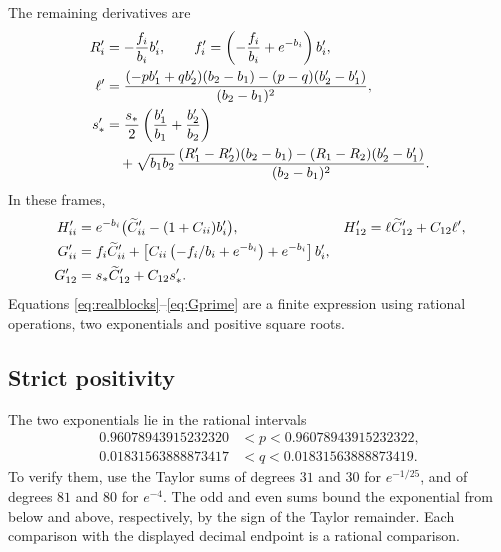 The remaining derivatives are
\begin{align}
 R_i'&=-\frac{f_i}{b_i}b_i',\qquad
 f_i'=\left(-\frac{f_i}{b_i}+e^{-b_i}\right)b_i',\label{eq:Rprime}\\
 \ell'&=\frac{(-pb_1'+qb_2')(b_2-b_1)
                    -(p-q)(b_2'-b_1')}{(b_2-b_1)^2},\label{eq:ellprime}\\
 s_*'&=\frac{s_*}{2}\left(\frac{b_1'}{b_1}+\frac{b_2'}{b_2}\right)\notag\\
 &\quad+\sqrt{b_1b_2}\,
  \frac{(R_1'-R_2')(b_2-b_1)-(R_1-R_2)(b_2'-b_1')}
       {(b_2-b_1)^2}.\label{eq:sprime}
\end{align}
In these frames,
\begin{align}
 H'_{ii}&=e^{-b_i}\bigl(\widetilde C'_{ii}-(1+C_{ii})b_i'\bigr),
 &H'_{12}&=\ell\widetilde C'_{12}+C_{12}\ell',\label{eq:Hprime}\\
 G'_{ii}&=f_i\widetilde C'_{ii}
 +\left[C_{ii}\left(-f_i/b_i+e^{-b_i}\right)+e^{-b_i}\right]b_i',
 &&\label{eq:Gprime}\\
 G'_{12}&=s_*\widetilde C'_{12}+C_{12}s_*'.&&\notag
\end{align}
Equations \eqref{eq:realblocks}--\eqref{eq:Gprime} are a finite expression
using rational operations, two exponentials and positive square roots.

\subsection{Strict positivity}
The two exponentials lie in the rational intervals
\begin{equation}\label{eq:expintervals}
 \begin{split}
 0.96078943915232320&<p<0.96078943915232322,\\
 0.01831563888873417&<q<0.01831563888873419.
 \end{split}
\end{equation}
To verify them, use the Taylor sums of degrees $31$ and $30$ for
$e^{-1/25}$, and of degrees $81$ and $80$ for $e^{-4}$.
The odd and even sums bound the exponential from below and above,
respectively, by the sign of the Taylor remainder. Each comparison with
the displayed decimal endpoint is a rational comparison.

